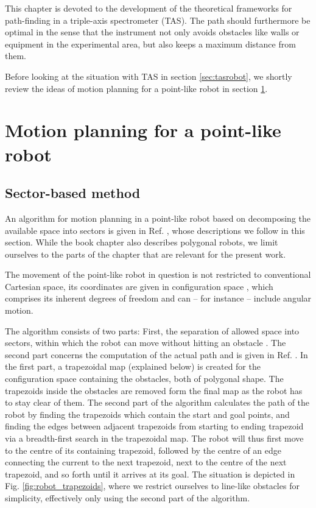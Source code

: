 %
%

This chapter is devoted to the development of the theoretical frameworks for path-finding in a triple-axis spectrometer (TAS). 
The path should furthermore be optimal in the sense that the instrument not only avoids obstacles like walls or equipment in 
the experimental area, but also keeps a maximum distance from them.

Before looking at the situation with TAS in section \ref{sec:tasrobot}, we shortly review the ideas of motion planning for a 
point-like robot in section \ref{sec:pointrobot}.



\section{Motion planning for a point-like robot}
\label{sec:pointrobot}

\subsection*{Sector-based method}
An algorithm for motion planning in a point-like robot based on decomposing the available space into sectors is 
given in Ref. \cite[Ch. 13, pp. 283-306]{Berg2008}, whose descriptions we follow in this section. 
While the book chapter also describes polygonal robots, we limit ourselves to the parts of the chapter 
that are relevant for the present work.

The movement of the point-like robot in question is not restricted to conventional Cartesian space, its coordinates are given in configuration
space  \cite[Ch. 13.1, pp. 284-286]{Berg2008}, which comprises its inherent degrees of freedom and can -- for instance -- include angular motion.

The algorithm consists of two parts: First, the separation of allowed space into sectors, within which the robot can move 
without hitting an obstacle \cite[p. 286]{Berg2008}. 
The second part concerns the computation of the actual path and is given in Ref. \cite[p. 289]{Berg2008}. 
In the first part, a trapezoidal map (explained below) is created for the configuration space containing the obstacles, 
both of polygonal shape. The trapezoids inside the obstacles are removed form the final map as the robot has to stay clear 
of them. The second part of the algorithm calculates the path of the robot by finding the trapezoids which contain the start 
and goal points, and finding the edges between adjacent trapezoids from starting to ending trapezoid via a breadth-first search in the 
trapezoidal map. The robot will thus first move to the centre of its containing trapezoid, followed by the centre of an edge connecting 
the current to the next trapezoid, next to the centre of the next trapezoid, and so forth until it arrives at its goal. 
The situation is depicted in Fig. \ref{fig:robot_trapezoids}, where we restrict ourselves to line-like obstacles for simplicity, effectively
only using the second part of the algorithm.

